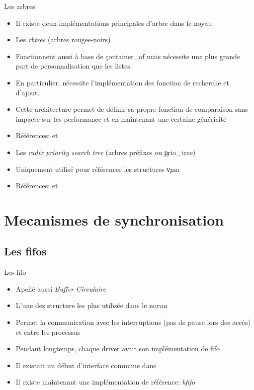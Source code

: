 \begin{frame}[fragile=singleslide]{Les arbres}
  \begin{itemize}
  \item  Il existe  deux implémentations  principales d'arbre  dans le
    noyau
  \item Les \emph{rbtree} (arbres rouges-noirs)
  \item Fonctionnent  aussi à base de  \c{container_of} mais nécessite
    une plus grande part de personnalisation que les listes.
  \item  En particulier,  nécessite l'implémentation  des  fonction de
    recherche et d'ajout.
  \item  Cette architecture permet  de définir  sa propre  fonction de
    comparaison sans impacte sur  les performance et en maintenant une
    certaine généricité
  \item       Références:            et
  \item  Les \emph{radix  priority  search tree}  (arbres préfixes  ou
    \c{prio_tree})
  \item Uniquement utilisé pour référencer les structures \c{vma}
  \item      Références:          et
  \end{itemize}
\end{frame}


\section{Mecanismes de synchronisation}

\subsection{Les fifos}

\begin{frame}[fragile=singleslide]{Les fifo}
  \begin{itemize}
  \item Apellé aussi \emph{Buffer Circulaire}
  \item L'une des structure les plus utilisée dans le noyau
  \item Permet  la communication avec les interruptions  (pas de pause
    lors des accès) et entre les processus
  \item Pendant  longtemps, chaque driver avait  son implémentation de
    fifo
  \item    Il   existait   un    début   d'interface    commune   dans
  \item  Il   existe  maintenant  une   implémentation  de  référence:
    \emph{kfifo}
  \end{itemize}
\end{frame}

